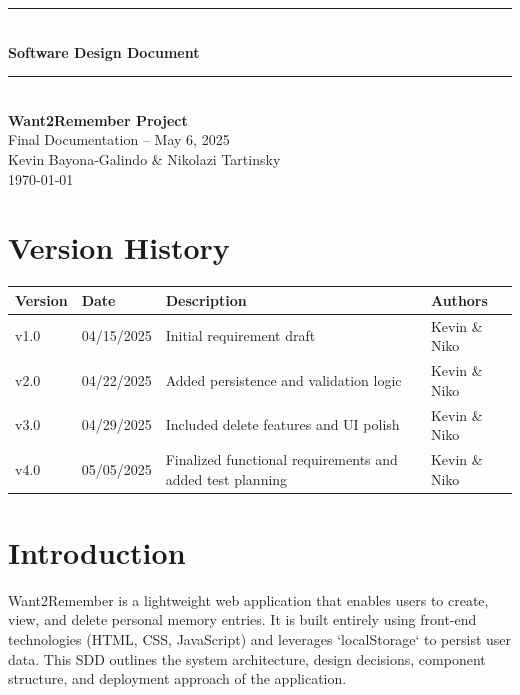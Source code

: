 \documentclass[12pt]{article}
\begin{document}
\begin{titlepage}
    \newcommand{\HRule}{\rule{\linewidth}{0.5mm}} 
    \vspace*{\fill}
    \begin{center}
        \HRule \\[0.5cm]
        {\Huge \bfseries Software Design Document \\[0.4cm]}
        \HRule \\[1.5cm]
        {\LARGE \textbf{Want2Remember Project}}\\[0.5cm]
        {\Large Final Documentation – May 6, 2025}\\[2cm]
        {\Large Kevin Bayona-Galindo \& Nikolazi Tartinsky}\\[0.5cm]
        {\large \today}
    \end{center}
    \vspace*{\fill}
\end{titlepage}

\tableofcontents
\newpage

\section*{Version History}
\begin{longtable}{|p{3cm}|p{3cm}|p{6cm}|p{4cm}|}
\hline
\textbf{Version} & \textbf{Date} & \textbf{Description} & \textbf{Authors} \\
\hline
v1.0 & 04/15/2025 & Initial requirement draft & Kevin \& Niko \\
\hline
v2.0 & 04/22/2025 & Added persistence and validation logic & Kevin \& Niko \\
\hline
v3.0 & 04/29/2025 & Included delete features and UI polish & Kevin \& Niko \\
\hline
v4.0 & 05/05/2025 & Finalized functional requirements and added test planning & Kevin \& Niko \\
\hline
\end{longtable}

\section{Introduction}
Want2Remember is a lightweight web application that enables users to create, view, and delete personal memory entries. It is built entirely using front-end technologies (HTML, CSS, JavaScript) and leverages `localStorage` to persist user data. This SDD outlines the system architecture, design decisions, component structure, and deployment approach of the application.
\end{document}
